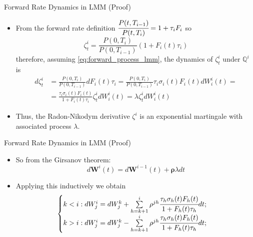 \documentclass{beamer}
\begin{document}
\begin{frame}{Forward Rate Dynamics in LMM (Proof)}
  \begin{itemize}
  \item<1-> From the forward rate definition $\cfrac{P(t,T_{i-1})}{P(t,T_i)} = 1 + \tau_i F_i$ so
    \begin{equation*}
      \zeta^i_t = \frac{P(0, T_i)}{P(0, T_{i-1})}(1+F_i(t)\tau_i)
    \end{equation*}
    therefore, assuming \cref{eq:forward_process_lmm}, the dynamics of $\zeta^i_t$ under $\mathbb{Q}^i$ is
    \begin{equation*}
      \begin{aligned}
	d\zeta^i_t &= \frac{P(0, T_i)}{P(0, T_{i-1})}dF_i(t)\tau_i = \frac{P(0, T_i)}{P(0, T_{i-1})}\tau_i\sigma_i(t)F_i(t)dW^i_i(t) = \\ &= \frac{\tau_i\sigma_i(t)F_i(t)}{1+F_i(t)\tau_i}\zeta_t^idW^i_i(t)=\lambda \zeta_t^idW^i_i(t)
      \end{aligned}
    \end{equation*}
  \item<2-> Thus, the Radon-Nikodym derivative $\zeta^i$ is an exponential martingale with associated process $\lambda$. %
  \end{itemize}
\end{frame}

\begin{frame}{Forward Rate Dynamics in LMM (Proof)}
  \begin{itemize}
  \item<1-> So from the Girsanov theorem:
    \begin{equation*}
      d\bm{W}^i(t) = d\bm{W}^{i-1}(t)+\bm{\rho}\lambda dt 
    \end{equation*}
  \item<2-> Applying this inductively we obtain
    \begin{equation*}
  	\begin{cases}
	k < i : dW^i_j = dW^k_j + \sum\limits_{h=k+1}^i \rho^{jh}\cfrac{\tau_h\sigma_h(t)F_h(t)}{1+F_h(t)\tau_h} dt;\\
	k > i : dW^i_j = dW^k_j - \sum\limits_{h=k+1}^i \rho^{jh}\cfrac{\tau_h\sigma_h(t)F_h(t)}{1+F_h(t)\tau_h} dt;\\
  	\end{cases}
    \end{equation*}
  \end{itemize}
\end{frame}
\end{document}
